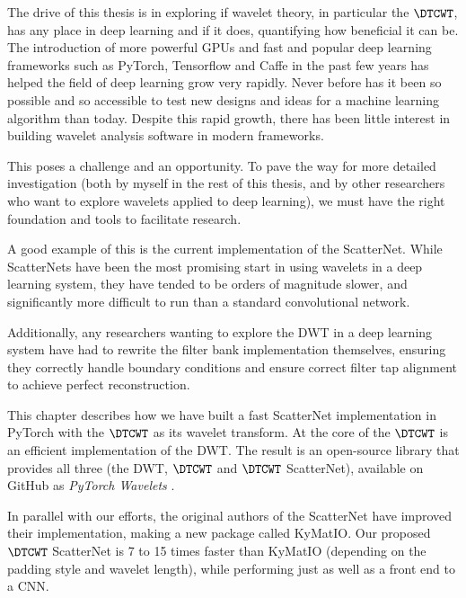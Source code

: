 The drive of this thesis is in exploring if wavelet theory, in
particular the $\DTCWT$, has any place in deep learning and if it does,
quantifying how beneficial it can be. The introduction of more powerful GPUs and
fast and popular deep learning frameworks such as PyTorch, Tensorflow and Caffe
in the past few years has helped the field of deep learning grow very rapidly.
Never before has it been so possible and so accessible to test new designs and
ideas for a machine learning algorithm than today. Despite this rapid growth,
there has been little interest in building wavelet analysis software in modern
frameworks.

This poses a challenge and an opportunity. To pave the way for more detailed
investigation (both by myself in the rest of this thesis, and by other researchers
who want to explore wavelets applied to deep learning), we must have the right
foundation and tools to facilitate research.

A good example of this is the current implementation of the ScatterNet. While
ScatterNets have been the most promising start in using wavelets in a deep
learning system, they have tended to be orders of magnitude slower, and significantly more
difficult to run than a standard convolutional network.

Additionally, any researchers wanting to explore the DWT in a deep learning
system have had to rewrite the filter bank implementation themselves, ensuring they
correctly handle boundary conditions and ensure correct filter tap alignment to
achieve perfect reconstruction.

This chapter describes how we have built a fast ScatterNet implementation in
PyTorch with the $\DTCWT$ as its wavelet transform. At the core of the $\DTCWT$ is an efficient
implementation of the DWT\@. The result is an open-source library that provides
all three (the DWT, $\DTCWT$ and $\DTCWT$ ScatterNet), available on GitHub as
\emph{PyTorch Wavelets} \cite{cotter_pytorch_2018}.

In parallel with our efforts, the original authors of the ScatterNet have
improved their implementation, making a new package called KyMatIO\cite{andreux_kymatio:_2018}. 
Our proposed $\DTCWT$ ScatterNet is 7 to 15 times faster than KyMatIO 
(depending on the padding style and wavelet length), while performing just as well
as a front end to a CNN.
